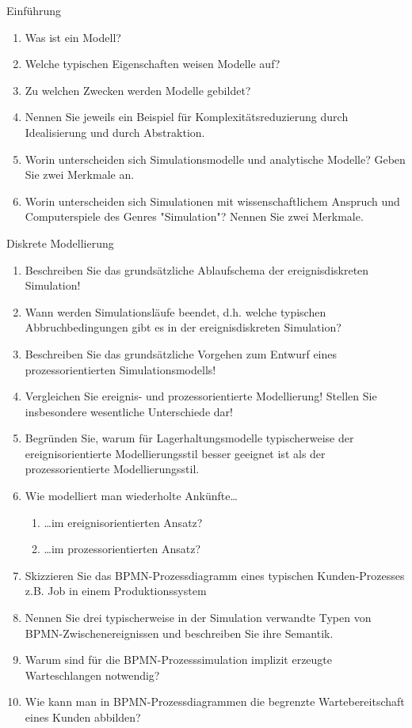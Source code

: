 \documentclass{article}
\author{Leopold Lemmermann}
\begin{document}
\createtitle

\begin{exercise}{Einführung}
  \begin{enumerate}
    \item Was ist ein Modell?
    \item Welche typischen Eigenschaften weisen Modelle auf?
    \item Zu welchen Zwecken werden Modelle gebildet?
    \item Nennen Sie jeweils ein Beispiel für Komplexitätsreduzierung durch Idealisierung und durch Abstraktion.
    \item Worin unterscheiden sich Simulationsmodelle und analytische Modelle? Geben Sie zwei Merkmale an.
    \item Worin unterscheiden sich Simulationen mit wissenschaftlichem Anspruch und Computerspiele des Genres "Simulation"? Nennen Sie zwei Merkmale.
  \end{enumerate}
\end{exercise}

\begin{exercise}{Diskrete Modellierung}
  \begin{enumerate}
    \item Beschreiben Sie das grundsätzliche Ablaufschema der ereignisdiskreten Simulation!
    \item Wann werden Simulationsläufe beendet, d.h. welche typischen Abbruchbedingungen gibt es in der ereignisdiskreten Simulation?
    \item Beschreiben Sie das grundsätzliche Vorgehen zum Entwurf eines prozessorientierten Simulationsmodells!
    \item Vergleichen Sie ereignis- und prozessorientierte Modellierung! Stellen Sie insbesondere wesentliche Unterschiede dar!
    \item Begründen Sie, warum für Lagerhaltungsmodelle typischerweise der ereignisorientierte Modellierungsstil besser geeignet ist als der prozessorientierte Modellierungsstil.
    \item Wie modelliert man wiederholte Ankünfte…
          \begin{enumerate}
            \item …im ereignisorientierten Ansatz?
            \item …im prozessorientierten Ansatz?
          \end{enumerate}
    \item Skizzieren Sie das BPMN-Prozessdiagramm eines typischen Kunden-Prozesses z.B. Job in einem Produktionssystem
    \item Nennen Sie drei typischerweise in der Simulation verwandte Typen von BPMN-Zwischenereignissen und beschreiben Sie ihre Semantik.
    \item Warum sind für die BPMN-Prozesssimulation implizit erzeugte Warteschlangen notwendig?
    \item Wie kann man in BPMN-Prozessdiagrammen die begrenzte Wartebereitschaft eines Kunden abbilden?
  \end{enumerate}
\end{exercise}
\end{document}
